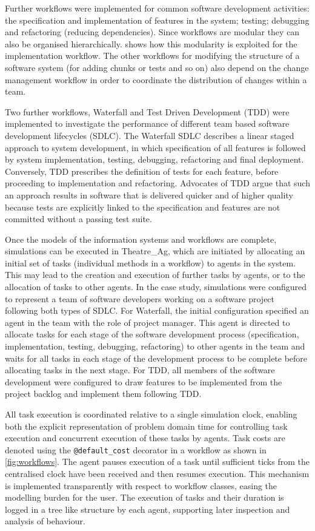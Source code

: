 \documentclass{llncs}
\begin{document}
Further workflows were implemented for common software development activities: the specification and implementation of
features in the system; testing; debugging and refactoring (reducing dependencies).  Since workflows are modular they
can also be organised hierarchically.   shows how this modularity is exploited for the
implementation workflow. The other workflows for modifying the structure of a software system (for adding chunks or
tests and so on) also depend on the change management workflow in order to coordinate the distribution of changes within
a team.

Two further workflows, Waterfall and Test Driven Development (TDD) were implemented to investigate the performance of
different team based software development lifecycles (SDLC).  The Waterfall SDLC \citep{benington83production} describes
a linear staged approach to system development, in which specification of all features is followed by system
implementation, testing, debugging, refactoring and final deployment.  Conversely, TDD \citep{beck02test} prescribes the
definition of tests for each feature, before proceeding to implementation and refactoring.  Advocates of TDD argue that
such an approach results in software that is delivered quicker and of higher quality because tests are explicitly linked
to the specification and features are not committed without a passing test suite.

Once the models of the information systems and workflows are complete, simulations can be executed in Theatre\_Ag, which
are initiated by allocating an initial set of tasks (individual methods in a workflow) to agents in the system. This may
lead to the creation and execution of further tasks by agents, or to the allocation of tasks to other agents.  In the
case study, simulations were configured to represent a team of software developers working on a software project
following both types of SDLC.  For Waterfall, the initial configuration specified an agent in the team with the role of
project manager.  This agent is directed to allocate tasks for each stage of the software development process
(specification, implementation, testing, debugging, refactoring) to other agents in the team and waits for all tasks in
each stage of the development process to be complete before allocating tasks in the next stage.  For TDD, all members of
the software development were configured to draw features to be implemented from the project backlog and implement them
following TDD.

All task execution is coordinated relative to a single simulation clock, enabling both the explicit representation of
problem domain time for controlling task execution and concurrent execution of these tasks by agents.  Task costs are
denoted using the \lstinline!@default_cost! decorator in a workflow as shown in \cref{fig:workflows}.  The agent pauses
execution of a task until sufficient ticks from the centralised clock have been received and then resumes execution.
This mechanism is implemented transparently with respect to workflow classes, easing the modelling burden for the user.
The execution of tasks and their duration is logged in a tree like structure by each agent, supporting later inspection
and analysis of behaviour.
\end{document}
